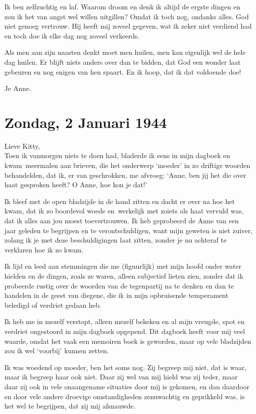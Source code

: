 \documentclass{book}
\begin{document}
Ik ben zelfzuchtig en laf. Waarom droom en denk ik altijd de ergste dingen en
zou ik het van angst wel willen uitgillen? Omdat ik toch nog, ondanks alles. God
niet genoeg vertrouw. Hij heeft mij zoveel gegeven, wat ik zeker niet verdiend
had en toch doe ik elke dag nog zoveel verkeerds.

Als men aan zijn naasten denkt moet men huilen, men kan eigenlijk wel de hele
dag huilen. Er blijft niets anders over dan te bidden, dat God een wonder laat
gebeuren en nog enigen van hen spaart. En ik hoop, dat ik dat voldoende doe!

Je Anne.

\section*{Zondag, 2 Januari 1944}

Lieve Kitty,\\
Toen ik vanmorgen niets te doen had, bladerde ik eens in mijn
dagboek en kwam~meermalen aan brieven, die het onderwerp `moeder' in zo driftige
woorden behandelden, dat ik, er van geschrokken, me afvroeg: `Anne, ben jij het
die over haat gesproken heeft? O Anne, hoe kon je dat!'

Ik bleef met de open bladzijde in de hand zitten en dacht er over na hoe het
kwam, dat ik zo boordevol woede en~werkelijk met zoiets als haat vervuld was,
dat ik alles aan jou moest toevertrouwen. Ik heb geprobeerd de Anne van een jaar
geleden te begrijpen en te verontschuldigen, want mijn geweten is niet zuiver,
zolang ik je met deze beschuldigingen laat zitten, zonder je nu achteraf te
verklaren hoe ik zo kwam.

Ik lijd en leed aan stemmingen die me (figuurlijk) met mijn hoofd onder water
hielden en de dingen, zoals ze waren, alleen subjectief lieten zien, zonder dat
ik probeerde rustig over de woorden van de tegenpartij na te denken en dan te
handelen in de geest van diegene, die ik in mijn opbruisende temperament
beledigd of verdriet gedaan heb.

Ik heb me in mezelf verstopt, alleen mezelf bekeken en al mijn vreugde, spot en
verdriet ongestoord in mijn dagboek opgepend. Dit dagboek heeft voor mij veel
waarde, omdat het vaak een memoiren boek is geworden, maar op vele bladzijden
zou ik wel `voorbij' kunnen zetten.

Ik was woedend op moeder, ben het soms nog. Zij begreep mij niet, dat is waar,
maar ik begreep haar ook niet. Daar zij wel van mij hield was zij teder, maar
daar zij ook in vele onaangename situaties door mij is gekomen, en dan daardoor
en door vele andere droevige omstandigheden zenuwachtig en geprikkeld was, is
het wel te begrijpen, dat zij mij afsnauwde.
\end{document}
